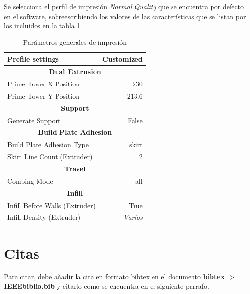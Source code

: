 \documentclass[colTwo]{NanouparIEEE}
\begin{document}
        Se selecciona el perfil de impresión \textit{Normal Quality} que se encuentra por defecto en el software, sobreescribiendo los valores de las características que se listan por los incluidos en la tabla \ref{parametros_impresion}.
        \begin{table}[ht!]
            \caption{Parámetros generales de impresión}
            \begin{center}
                \begin{tabular}{l|r}
                    Profile settings & Customized \\
                    \hline \hline \multicolumn{2}{c}{\textbf{Dual Extrusion}} \\
                    \hline Prime Tower X Position & $230$ \\
                    \hline Prime Tower Y Position & $213.6$ \\
                    \hline \hline \multicolumn{2}{c}{\textbf{Support}} \\ 
                    \hline Generate Support & False \\
                    \hline \hline \multicolumn{2}{c}{\textbf{ Build Plate Adhesion}} \\ 
                    \hline Build Plate Adhesion Type & skirt\\
                    \hline Skirt Line Count (Extruder) & 2 \\
                    \hline \hline \multicolumn{2}{c}{\textbf{Travel}} \\ 
                    \hline Combing Mode & all \\
                    \hline \hline \multicolumn{2}{c}{\textbf{Infill}} \\ 
                    \hline Infill Before Walls (Extruder) & True \\
                    \hline Infill Density (Extruder) & \textit{Varios} \\
                    \hline
                    \end{tabular}
            \end{center}
            \label{parametros_impresion}
        \end{table}
            

    \section{Citas}

        Para citar, debe añadir la cita en formato bibtex en el documento \textbf{bibtex $>$ IEEEbiblio.bib} y citarlo como se encuentra en el siguiente parrafo.
\end{document}
